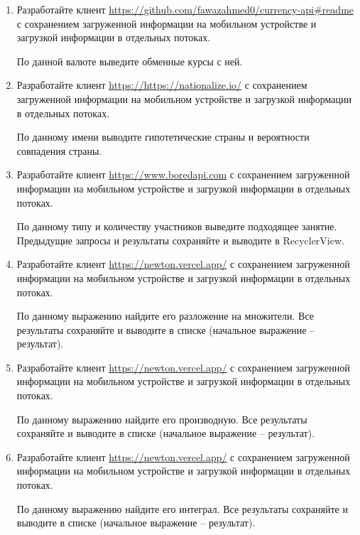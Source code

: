 \begin{enumerate}
		По данному авторы выведите его произведения (начальные фрагменты).

	\item Разработайте клиент \url{https://github.com/fawazahmed0/currency-api#readme} с сохранением загруженной информации на мобильном устройстве и загрузкой
		информации в отдельных потоках. 

		По данной валюте выведите обменные курсы с ней.
		
	\item Разработайте клиент \url{https://https://nationalize.io/} с сохранением загруженной информации на мобильном устройстве и загрузкой
		информации в отдельных потоках. 

		По данному имени выводите гипотетические страны и вероятности совпадения страны.

	\item Разработайте клиент \url{https://www.boredapi.com} с сохранением загруженной информации на мобильном устройстве и загрузкой
		информации в отдельных потоках. 

		По данному типу и количеству участников выведите подходящее занятие. Предыдущие запросы и результаты сохраняйте и выводите в 
		RecyclerView.




	\item Разработайте клиент \url{https://newton.vercel.app/} с сохранением загруженной информации на мобильном устройстве и загрузкой
		информации в отдельных потоках. 

		По данному выражению найдите его разложение на множители. Все результаты сохраняйте и выводите в списке (начальное выражение -- результат).

	\item Разработайте клиент \url{https://newton.vercel.app/} с сохранением загруженной информации на мобильном устройстве и загрузкой
		информации в отдельных потоках. 

		По данному выражению найдите его производную. Все результаты сохраняйте и выводите в списке (начальное выражение -- результат).

	\item Разработайте клиент \url{https://newton.vercel.app/} с сохранением загруженной информации на мобильном устройстве и загрузкой
		информации в отдельных потоках. 

		По данному выражению найдите его интеграл. Все результаты сохраняйте и выводите в списке (начальное выражение -- результат).
























\end{enumerate}



